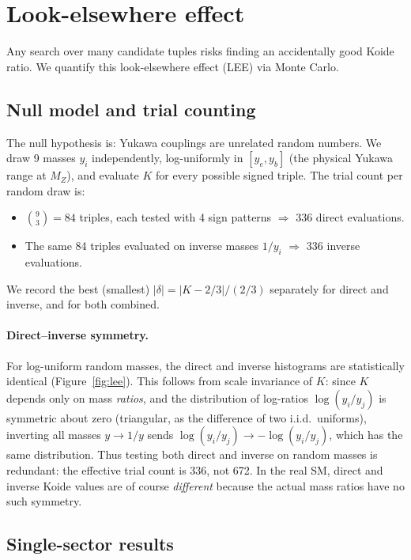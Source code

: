 \documentclass[11pt,a4paper]{article}
\begin{document}
\section{Look-elsewhere effect}
\label{sec:lee}

Any search over many candidate tuples risks finding an accidentally
good Koide ratio. We quantify this look-elsewhere effect (LEE) via
Monte Carlo.

\subsection{Null model and trial counting}

The null hypothesis is: Yukawa couplings are unrelated random numbers.
We draw 9 masses $y_i$ independently, log-uniformly in $[y_e, y_b]$
(the physical Yukawa range at $M_Z$), and evaluate $K$ for every
possible signed triple. The trial count per random draw is:
\begin{itemize}
\item $\binom{9}{3} = 84$ triples, each tested with 4 sign
  patterns $\Rightarrow$ 336 direct evaluations.
\item The same 84 triples evaluated on inverse masses $1/y_i$
  $\Rightarrow$ 336 inverse evaluations.
\end{itemize}
We record the best (smallest) $|\delta| = |K - 2/3|/(2/3)$
separately for direct and inverse, and for both combined.

\paragraph{Direct--inverse symmetry.}
For log-uniform random masses, the direct and inverse histograms are
statistically identical (Figure~\ref{fig:lee}). This follows from
scale invariance of $K$: since $K$ depends only on mass \emph{ratios},
and the distribution of log-ratios $\log(y_i/y_j)$ is symmetric
about zero (triangular, as the difference of two i.i.d.\ uniforms),
inverting all masses $y \to 1/y$ sends $\log(y_i/y_j) \to
-\log(y_i/y_j)$, which has the same distribution. Thus testing
both direct and inverse on random masses is redundant: the effective
trial count is 336, not 672. In the real SM, direct and inverse
Koide values are of course \emph{different} because the actual mass
ratios have no such symmetry.

\subsection{Single-sector results}
\end{document}

